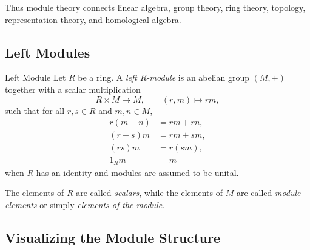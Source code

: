 Thus module theory connects linear algebra, group theory, ring theory,
topology, representation theory, and homological algebra.

\subsection{Left Modules}
\label{subsec:left-modules}

\begin{definitionbox}{Left Module}
Let \(R\) be a ring. A \emph{left \(R\)-module} is an abelian group
\((M,+)\) together with a scalar multiplication
\[ R\times M\to M,\qquad (r,m)\mapsto rm, \]
such that for all \(r,s\in R\) and \(m,n\in M\),
\[
\begin{aligned}
r(m+n)&=rm+rn,\\
(r+s)m&=rm+sm,\\
(rs)m&=r(sm),\\
1_Rm&=m
\end{aligned}
\]
when \(R\) has an identity and modules are assumed to be unital.
\end{definitionbox}

The elements of \(R\) are called \emph{scalars}, while the elements of \(M\)
are called \emph{module elements} or simply \emph{elements of the module}.

\subsection{Visualizing the Module Structure}
\label{subsec:visual-module-structure}

\begin{center}
\end{center}

